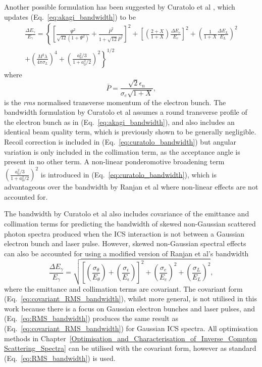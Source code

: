 \documentclass[../main.tex]{subfiles}
\begin{document}
Another possible formulation has been suggested by Curatolo et al \cite{curatolo2017analytical}, which updates (Eq.~\ref{eq:akagi_bandwidth}) to be
\begin{multline}
\frac{\Delta E_{\gamma}}{E_{\gamma}} = \left\{\left[\frac{\Psi^{2}}{\sqrt{12}\left(1+\Psi^{2}\right)}+\frac{\bar{P}^{2}}{1+\sqrt{12}\bar{P}^{2}}\right]^{2}+\left[\left(\frac{2+X}{1+X}\right)\frac{\Delta E_{e}}{E_{e}}\right]^{2}+\left(\frac{1}{1+X}\frac{\Delta E_{L}}{E_{L}}\right)^{2} \right.\\\left. +\left(\frac{M^{2}\lambda}{4\pi\sigma_{L}}\right)^{4}+\left(\frac{a_{0}^{2}/3}{1+a_{0}^{2}/2}\right)^{2}\right\}^{1/2}
\label{eq:curatolo_bandwidth}    
\end{multline}
where 
\begin{equation}
\bar{P} = \frac{\sqrt{2}\epsilon_{n}}{\sigma_{e}\sqrt{1+X}},
\label{eq:curatolo_p_bar}    
\end{equation}
is the \textit{rms} normalised transverse momentum of the electron bunch. The bandwidth formulation by Curatolo et al assumes a round transverse profile of the electron bunch as in (Eq.~\ref{eq:akagi_bandwidth}), and also includes an identical beam quality term, which is previously shown to be generally negligible. Recoil correction is included in (Eq.~\ref{eq:curatolo_bandwidth}) but angular variation is only included in the collimation term, as the acceptance angle is present in no other term. A non-linear ponderomotive broadening term $\left(\frac{a_{0}^{2}/3}{1+a_{0}^{2}/2}\right)^{2}$ is introduced in (Eq.~\ref{eq:curatolo_bandwidth}), which is advantageous over the bandwidth by Ranjan et al \cite{ranjan2018simulation} where non-linear effects are not accounted for. 

The bandwidth by Curatolo et al \cite{curatolo2017analytical} also includes covariance of the emittance and collimation terms for predicting the bandwidth of skewed non-Gaussian scattered photon spectra \cite{ranjan2018simulation} produced when the ICS interaction is not between a Gaussian electron bunch and laser pulse. However, skewed non-Gaussian spectral effects can also be accounted for using a modified version of Ranjan et al's bandwidth
\begin{equation}
\frac{\Delta E_{\gamma}}{E_{\gamma}} = \sqrt{\left[\left(\frac{\sigma_{\theta}}{E_{\theta}}\right)+\left(\frac{\sigma_{\epsilon}}{E_{\epsilon}}\right)\right]^{2}+\left(\frac{\sigma_{e}}{E_{e}}\right)^{2}+\left(\frac{\sigma_{L}}{E_{L}}\right)^{2}},
\label{eq:covariant_RMS_bandwidth}    
\end{equation}
where the emittance and collimation terms are covariant. The covariant form (Eq.~\ref{eq:covariant_RMS_bandwidth}), whilst more general, is not utilised in this work because there is a focus on Gaussian electron bunches and laser pulses, and (Eq.~\ref{eq:RMS_bandwidth}) produces the same result as (Eq.~\ref{eq:covariant_RMS_bandwidth}) for Gaussian ICS spectra. All optimisation methods in Chapter~\ref{Optimisation_and_Characterisation_of_Inverse_Compton Scattering_Spectra} can be utilised with the covariant form, however as standard (Eq.~\ref{eq:RMS_bandwidth}) is used. 
\end{document}
